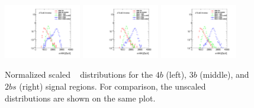 \begin{figure}[htb!]
\begin{center}
\includegraphics[width=0.3\textwidth,angle=-90]{figures/boosted/Other/FourTag_Signal_compare_scale_mHH_1.pdf}
\includegraphics[width=0.3\textwidth,angle=-90]{figures/boosted/Other/ThreeTag_Signal_compare_scale_mHH_1.pdf}
\includegraphics[width=0.3\textwidth,angle=-90]{figures/boosted/Other/TwoTag_split_Signal_compare_scale_mHH_1.pdf}
\caption{Normalized scaled \mtwoJ~ distributions for the $4b$ (left), $3b$ (middle), and $2bs$ (right) signal regions. For comparison, the unscaled  \mtwoJ~ distributions are shown on the same plot. }
\label{fig:signal-region-bkg-scaled}
\end{center}
\end{figure}

